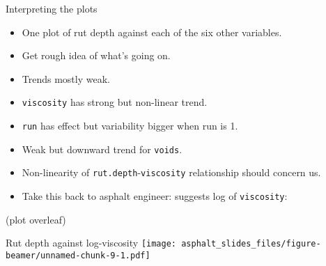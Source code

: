 \begin{frame}[fragile]{Interpreting the plots}
\protect\hypertarget{interpreting-the-plots}{}
\begin{itemize}
\tightlist
\item
  One plot of rut depth against each of the six other variables.
\item
  Get rough idea of what's going on.
\item
  Trends mostly weak.
\item
  \texttt{viscosity} has strong but non-linear trend.
\item
  \texttt{run} has effect but variability bigger when run is 1.
\item
  Weak but downward trend for \texttt{voids}.
\item
  Non-linearity of \texttt{rut.depth}-\texttt{viscosity} relationship
  should concern us.
\item
  Take this back to asphalt engineer: suggests log of
  \texttt{viscosity}:
\end{itemize}

\begin{Shaded}
\begin{Highlighting}[]
\NormalTok{(} \OperatorTok{+}
\StringTok{  }\NormalTok{() }\OperatorTok{+}\StringTok{ }\NormalTok{(}
\end{Highlighting}
\end{Shaded}

(plot overleaf)
\end{frame}

\begin{frame}{Rut depth against log-viscosity}
\protect\hypertarget{rut-depth-against-log-viscosity}{}
\texttt{[image: asphalt\_slides\_files/figure-beamer/unnamed-chunk-9-1.pdf]}
\end{frame}

